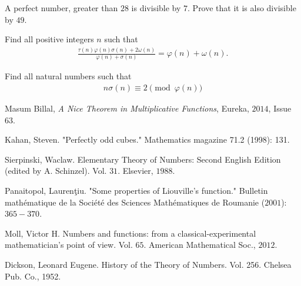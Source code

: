 \documentclass[12pt]{subfile}
\begin{document}
	\begin{problem} %
		A perfect number, greater than $28$ is divisible by $7$. Prove that it is also divisible by $49$.
	\end{problem}

	\begin{problem} %
		Find all positive integers $n$ such that
			\begin{align*}
				\frac{\tau(n)\varphi( n)\sigma(n)+2\omega(n)}{\varphi( n)+\sigma(n)}=\varphi( n)+\omega(n) .
			\end{align*}
	\end{problem}

	\begin{problem}[IMS 2008] %
		Find all natural numbers such that
			\begin{align*}
				n\sigma(n)\equiv 2\pmod {\varphi( n)}
			\end{align*}
	\end{problem}
	
\begin{thebibliography}{99}
	 Masum Billal, \textsl{A Nice Theorem in Multiplicative Functions}, Eureka, $2014$, Issue $63$.
	
	 Kahan, Steven. "Perfectly odd cubes." Mathematics magazine 71.2 (1998): 131.
	
	 Sierpinski, Waclaw. Elementary Theory of Numbers: Second English Edition (edited by A. Schinzel). Vol. $31$. Elsevier, $1988$.
	
	 Panaitopol, Laurenţiu. "Some properties of Liouville's function." Bulletin mathématique de la Société des Sciences Mathématiques de Roumanie ($2001$): $365-370$.
	
	 Moll, Victor H. Numbers and functions: from a classical-experimental mathematician's point of view. Vol. $65$. American Mathematical Soc., $2012$.
	
	 Dickson, Leonard Eugene. History of the Theory of Numbers. Vol. 256. Chelsea Pub. Co., 1952.
\end{thebibliography}
\end{document}
